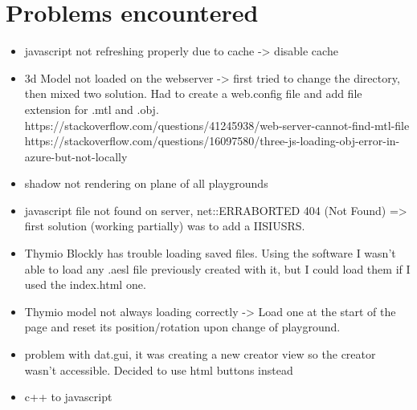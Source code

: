 \documentclass{scrbook}
\begin{document}
\chapter{Problems encountered}
\begin{itemize}
  \item javascript not refreshing properly due to cache -> disable cache
  \item 3d Model not loaded on the webserver -> first tried to change the directory, then mixed two solution. 
        Had to create a web.config file and add file extension for .mtl and .obj.
        https://stackoverflow.com/questions/41245938/web-server-cannot-find-mtl-file
        https://stackoverflow.com/questions/16097580/three-js-loading-obj-error-in-azure-but-not-locally
  \item shadow not rendering on plane of all playgrounds
  \item javascript file not found on server, net::ERR\textunderscore ABORTED 404 (Not Found) => first solution (working partially) was to add a IIS\textunderscore IUSRS.
  \item Thymio Blockly has trouble loading saved files. Using the software I wasn't able to load any .aesl file previously created with it, but I could load them if I used the index.html one.
  \item Thymio model not always loading correctly -> Load one at the start of the page and reset its position/rotation upon change of playground.
  \item problem with dat.gui, it was creating a new creator view so the creator wasn't accessible. Decided to use html buttons instead
  \item c++ to javascript
\end{itemize}
\end{document}
